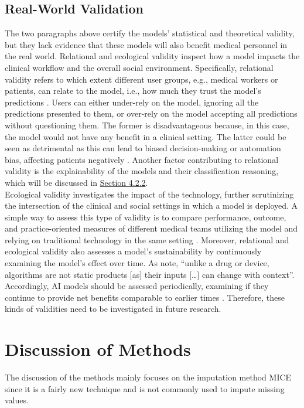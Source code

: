 \subsection{Real-World Validation}
The two paragraphs above certify the models' statistical and theoretical 
validity, but they lack evidence that these models will also benefit medical 
personnel in the real world. Relational and ecological validity inspect how a 
model impacts the clinical workflow and the overall social environment. 
Specifically, relational validity refers to which extent different user groups, 
e.g., medical workers or patients, can relate to the model, i.e., how much they 
trust the model's predictions \cite{RN151}. Users can either under-rely on 
the model, ignoring all the predictions presented to them, or over-rely on the 
model accepting all predictions without questioning them. The former is 
disadvantageous because, in this case, the model would not have any benefit in 
a clinical setting. The latter could be seen as detrimental as this can lead to 
biased decision-making or automation bias, affecting patients 
negatively \cite{RN151, RN152}. Another factor contributing to relational 
validity is the explainability of the models and their classification reasoning, 
which will be discussed in \hyperref[sec:classifiers]{Section 4.2.2}.
\\
Ecological validity investigates the impact of the technology, further 
scrutinizing the intersection of the clinical and social settings in which a 
model is deployed. A simple way to assess this type of validity is to compare 
performance, outcome, and practice-oriented measures of different medical 
teams utilizing the model and relying on traditional technology in the same 
setting \cite{RN152}. Moreover, relational and ecological validity also 
assesses a model's sustainability by continuously examining the model's 
effect over time. As \citeauthor{RN198} \cite{RN198} note, ``unlike a drug or 
device, algorithms are not static products [as] their inputs […] can change 
with context''. Accordingly, AI models should be assessed periodically, 
examining if they continue to provide net benefits comparable to earlier times 
\cite{RN152}. Therefore, these kinds of validities need to be investigated in 
future research.
\section{Discussion of Methods}
The discussion of the methods mainly focuses on the imputation method MICE 
since it is a fairly new technique and is not commonly used to impute missing 
values.
